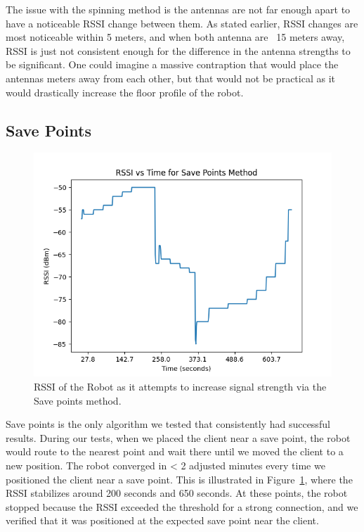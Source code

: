The issue with the spinning method is the antennas are not far enough apart to have a noticeable RSSI change between them. As stated earlier, RSSI changes are most noticeable within 5 meters, and when both antenna are ~15 meters away, RSSI is just not consistent enough for the difference in the antenna strengths to be significant. One could imagine a massive contraption that would place the antennas meters away from each other, but that would not be practical as it would drastically increase the floor profile of the robot.

\subsection{Save Points}

\begin{figure}[tp]

\centering

\includegraphics[scale=0.5]{figures/rssi_save_points}

\caption{RSSI of the Robot as it attempts to increase signal strength via the Save points method.}

\label{fig:rssi_save_points}

\end{figure}

Save points is the only algorithm we tested that consistently had successful results. During our tests, when we placed the client near a save point, the robot would route to the nearest point and wait there until we moved the client to a new position. The robot converged in < 2 adjusted minutes every time we positioned the client near a save point. This is illustrated in Figure~\ref{fig:rssi_save_points}, where the RSSI stabilizes around 200 seconds and 650 seconds. At these points, the robot stopped because the RSSI exceeded the threshold for a strong connection, and we verified that it was positioned at the expected save point near the client.

